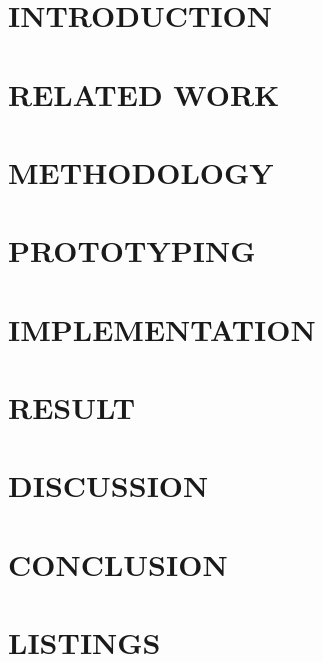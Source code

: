 \documentclass[12pt, twoside]{report}
\makeatletter
\newcommand\AppendixName{Appendix}
\let\oldappendix\appendix
\renewcommand{\appendix}{%
  \oldappendix
  \renewcommand{\chaptername}{\AppendixName}  \renewcommand{\thechapter}{\@Alph\c@chapter}}
\makeatother
\begin{document}
\chapter{INTRODUCTION}
\setcounter{page}{1}


\chapter{RELATED WORK}


\chapter{METHODOLOGY}


\chapter{PROTOTYPING}


\chapter{IMPLEMENTATION}

	
\chapter{RESULT}

	
\chapter{DISCUSSION}

	
\chapter{CONCLUSION}





\appendix
\chapter{LISTINGS}

\end{document}
